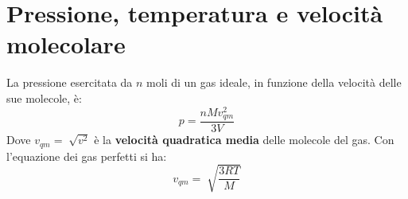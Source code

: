     \section{Pressione, temperatura e velocità molecolare} La pressione 
    esercitata da $n$ moli di un gas ideale, in funzione della velocità delle
    sue molecole, è:
            \begin{equation}
                p = \frac{nMv^2_{qm}}{3V}
            \end{equation}
    Dove $v_{qm} = \sqrt[]{v^2}$ è la \textbf{velocità quadratica media} delle
    molecole del gas. Con l'equazione dei gas perfetti si ha:
            \begin{equation}
                v_{qm} = \sqrt[]{\frac{3RT}{M}}
            \end{equation}